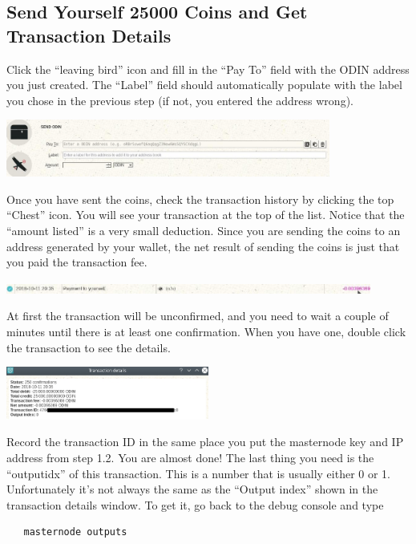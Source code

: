 \documentclass[rmp,12pt,notitlepage]{revtex4-1}
\begin{document}
\subsection{Send Yourself \num{25000} Coins and Get Transaction Details}
Click the ``leaving bird'' icon and fill in the ``Pay To'' field with the ODIN address you just created.  The ``Label'' field should automatically populate with the label you chose in the previous step (if not, you entered the address wrong).
\begin{center}
\includegraphics[width=0.8\textwidth]{send}
\end{center}
Once you have sent the coins, check the transaction history by clicking the top ``Chest'' icon.  You will see your transaction at the top of the list.  Notice that the ``amount listed'' is a very small deduction.  Since you are sending the coins to an address generated by your wallet, the net result of sending the coins is just that you paid the transaction fee. 
\begin{center}
   \includegraphics[width=0.9\textwidth]{history}
\end{center}
At first the transaction will be unconfirmed, and you need to wait a couple of minutes until there is at least one confirmation.  When you have one, double click the transaction to see the details.  
\begin{center}
   \includegraphics[width=0.5\textwidth]{details}
\end{center}
Record the transaction ID in the same place you put the masternode key and IP address from step 1.2.  You are almost done!  The last thing you need is the ``outputidx'' of this transaction.  This is a number that is usually either 0 or 1.  Unfortunately it's not always the same as the ``Output index'' shown in the transaction details window.  To get it, go back to the debug console and type
\begin{verbatim}
   masternode outputs
\end{verbatim}
\end{document}
